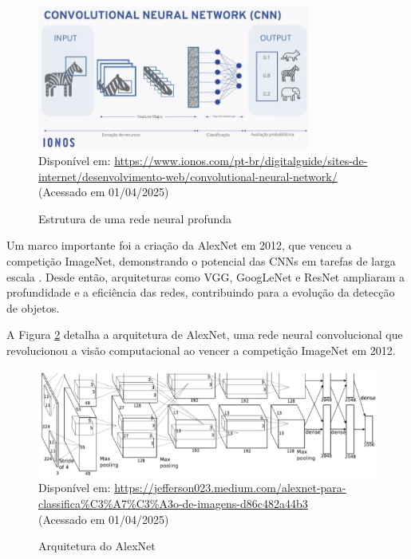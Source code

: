 \begin{figure}[htbp]
  \centering
  \caption{Estrutura de uma rede neural profunda}
  \includegraphics[width=0.8\textwidth]{Figuras/cnn.png}
  \\
  Disponível em: \url{https://www.ionos.com/pt-br/digitalguide/sites-de-internet/desenvolvimento-web/convolutional-neural-network/} (Acessado em 01/04/2025)
  \label{fg-cnn}
\end{figure}

Um marco importante foi a criação da AlexNet em 2012, que venceu a competição ImageNet, demonstrando o potencial das CNNs em tarefas de larga escala \cite{krizhevsky2012}. Desde então, arquiteturas como VGG, GoogLeNet e ResNet ampliaram a profundidade e a eficiência das redes, contribuindo para a evolução da detecção de objetos.

A Figura \ref{fg1} detalha a arquitetura de AlexNet, uma rede neural convolucional que revolucionou a visão computacional ao vencer a competição ImageNet em 2012.

\begin{figure}[htbp]
  \centering
  \caption{Arquitetura do AlexNet}
  \includegraphics[width=1.0\textwidth]{Figuras/arquitetura-alexnet.png}
  \\
  Disponível em: \url{https://jefferson023.medium.com/alexnet-para-classifica%C3%A7%C3%A3o-de-imagens-d86c482a44b3} \\(Acessado em 01/04/2025)
  \label{fg1}
\end{figure}


